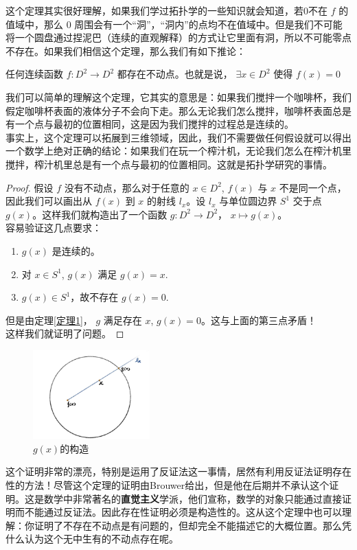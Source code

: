这个定理其实很好理解，如果我们学过拓扑学的一些知识就会知道，若0不在 $ f  $ 的值域中，那么 $ 0 $ 周围会有一个“洞”，“洞内”的点均不在值域中。但是我们不可能将一个圆盘通过捏泥巴（连续的直观解释）的方式让它里面有洞，所以不可能零点不存在。如果我们相信这个定理，那么我们有如下推论：
\begin{theorem}
    任何连续函数 $ f:D^2\rightarrow D^2  $ 都存在不动点。也就是说， $ \exists x\in D^2 $ 使得 $ f(x)=0 $ 
\end{theorem}
\begin{remark}
    我们可以简单的理解这个定理，它其实的意思是：如果我们搅拌一个咖啡杯，我们假定咖啡杯表面的液体分子不会向下走。那么无论我们怎么搅拌，咖啡杯表面总是有一个点与最初的位置相同，这是因为我们搅拌的过程总是连续的。\\
    事实上，这个定理可以拓展到三维领域，因此，我们不需要做任何假设就可以得出一个数学上绝对正确的结论：如果我们在玩一个榨汁机，无论我们怎么在榨汁机里搅拌，榨汁机里总是有一个点与最初的位置相同。这就是拓扑学研究的事情。
\end{remark}
\begin{proof}
    假设 $ f  $ 没有不动点，那么对于任意的 $ x\in D^2 $,  $ f(x)  $ 与 $ x  $ 不是同一个点，因此我们可以画出从 $ f(x) $ 到 $ x  $ 的射线 $ l_x $。设 $ l_x  $ 与单位圆边界 $ S^1 $ 交于点 $ g(x) $。这样我们就构造出了一个函数 $ g:D^2\rightarrow D^2  $， $  x\mapsto g(x) $。\\
    容易验证这几点要求：
    \begin{enumerate}
        \item $ g(x) $ 是连续的。
        \item 对 $ x\in S^1 $, $ g(x) $ 满足 $ g(x)=x $.
        \item  $ g(x)\in S^1 $，故不存在 $ g(x)=0 $.  
    \end{enumerate}  
    但是由定理\ref{定理1}， $ g  $ 满足存在 $ x $,  $ g(x)=0 $。这与上面的第三点矛盾！\\
    这样我们就证明了问题。   
\end{proof}
\begin{figure}[htb]
    \centering
    \includegraphics[width=0.4\textwidth]{Brouwer.jpg}
    \caption{$ g(x) $的构造}
    \label{Brouwer定理}
\end{figure}
\begin{remark}
    这个证明非常的漂亮，特别是运用了反证法这一事情，居然有利用反证法证明存在性的方法！尽管这个定理的证明由Brouwer给出，但是他在后期并不承认这个证明。这是数学中非常著名的\textbf{直觉主义}学派，他们宣称，数学的对象只能通过直接证明而不能通过反证法。因此存在性证明必须是构造性的。这从这个定理中也可以理解：你证明了不存在不动点是有问题的，但却完全不能描述它的大概位置。那么凭什么认为这个无中生有的不动点存在呢。
\end{remark}

